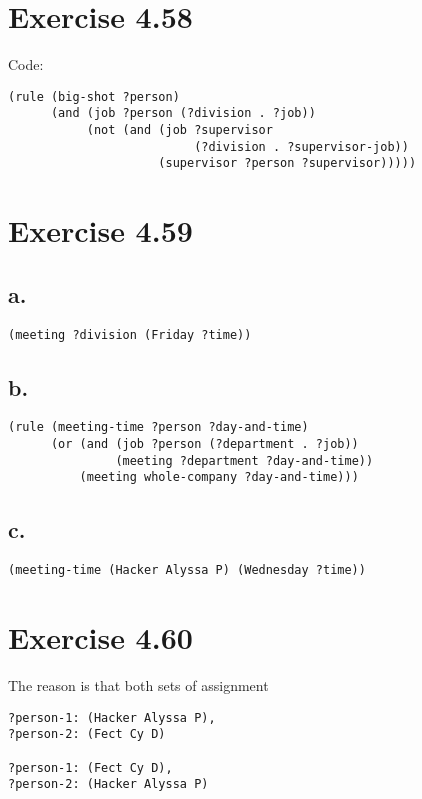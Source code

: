 \documentclass[../main.tex]{subfiles}
\begin{document}
\section{Exercise 4.58}

Code:

\begin{lstlisting}
(rule (big-shot ?person)
      (and (job ?person (?division . ?job))
           (not (and (job ?supervisor
                          (?division . ?supervisor-job))
                     (supervisor ?person ?supervisor)))))
\end{lstlisting}

\section{Exercise 4.59}

\subsection{a.}

\begin{lstlisting}
(meeting ?division (Friday ?time))
\end{lstlisting}

\subsection{b.}

\begin{lstlisting}
(rule (meeting-time ?person ?day-and-time)
      (or (and (job ?person (?department . ?job))
               (meeting ?department ?day-and-time))
          (meeting whole-company ?day-and-time)))
\end{lstlisting}

\subsection{c.}

\begin{lstlisting}
(meeting-time (Hacker Alyssa P) (Wednesday ?time))
\end{lstlisting}

\section{Exercise 4.60}

The reason is that both sets of assignment

\begin{lstlisting}
?person-1: (Hacker Alyssa P),
?person-2: (Fect Cy D)

?person-1: (Fect Cy D),
?person-2: (Hacker Alyssa P)
\end{lstlisting}
\end{document}

